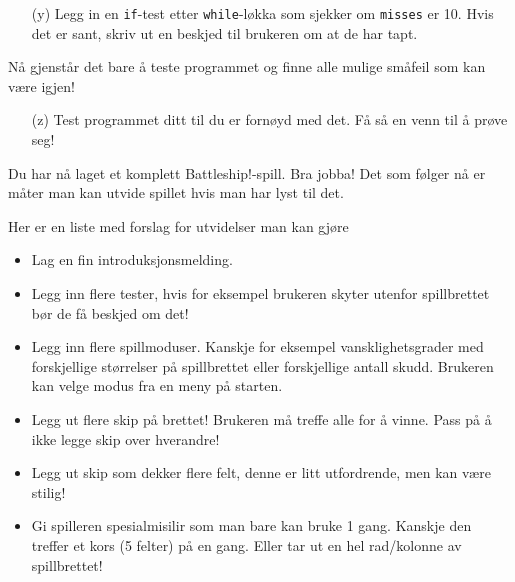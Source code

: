 \documentclass[a4paper, 11pt, notitlepage]{article}
\begin{document}
\begin{itemize}
\item[(y)] Legg in en \verb+if+-test etter \verb+while+-løkka som sjekker om \verb+misses+ er 10. Hvis det er sant, skriv ut en beskjed til brukeren om at de har tapt.
\end{itemize}

Nå gjenstår det bare å teste programmet og finne alle mulige småfeil som kan være igjen!

\begin{itemize}
\item[(z)] Test programmet ditt til du er fornøyd med det. Få så en venn til å prøve seg!
\end{itemize}

Du har nå laget et komplett Battleship!-spill. Bra jobba! Det som følger nå er måter man kan utvide spillet hvis man har lyst til det.

\clearpage

Her er en liste med forslag for utvidelser man kan gjøre
\begin{itemize}
	\item Lag en fin introduksjonsmelding.
	\item Legg inn flere tester, hvis for eksempel brukeren skyter utenfor spillbrettet bør de få beskjed om det!
	\item Legg inn flere spillmoduser. Kanskje for eksempel vansklighetsgrader med forskjellige størrelser på spillbrettet eller forskjellige antall skudd. Brukeren kan velge modus fra en meny på starten.
	\item Legg ut flere skip på brettet! Brukeren må treffe alle for å vinne. Pass på å ikke legge skip over hverandre!
	\item Legg ut skip som dekker flere felt, denne er litt utfordrende, men kan være stilig!
	\item Gi spilleren spesialmisilir som man bare kan bruke 1 gang. Kanskje den treffer et kors (5 felter) på en gang. Eller tar ut en hel rad/kolonne av spillbrettet!
\end{itemize}
\end{document}

